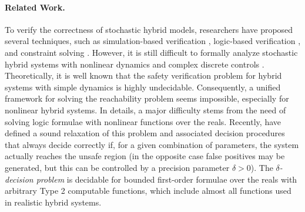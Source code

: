\paragraph{Related Work.}To verify the correctness of stochastic hybrid models, researchers have proposed several techniques, such as simulation-based verification \cite{zuliani2010bayesian, abate2007probabilistic}, logic-based verification \cite{platzer2011stochastic}, and constraint solving \cite{franzle2008stochastic}. However, it is still difficult to formally analyze stochastic hybrid systems with nonlinear dynamics and complex discrete controls \cite{alur2011formal, henzinger2000theory}. Theoretically, it is well known that the safety verification problem for hybrid systems with simple dynamics is highly undecidable. Consequently, a unified framework for solving the reachability problem seems impossible, especially for nonlinear hybrid systems. In details, a major difficulty stems from the need of solving logic formulae with nonlinear functions over the reals. Recently, \cite{gao2013dreal, gao2013satisfiability} 
have defined a sound relaxation of this problem and associated decision procedures that always decide correctly 
if, for a given combination of parameters, the system actually reaches the unsafe region (in the opposite case
false positives may be generated, but this can be controlled by a precision parameter $\delta>0$).
The $\delta${\em -decision problem} is decidable for bounded first-order formulae over the reals with arbitrary 
Type 2 computable functions, which include almost all functions used in realistic hybrid systems.   
